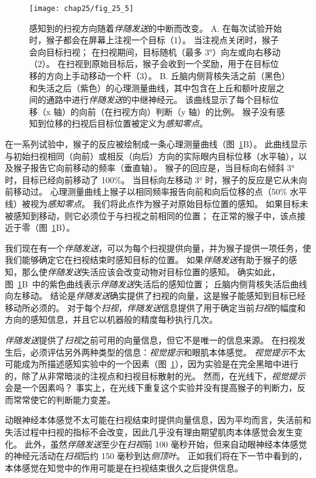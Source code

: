 \begin{figure}[htbp]
	\centering
	\texttt{[image: chap25/fig\_25\_5]}
	\caption{感知到的扫视方向随着\textit{伴随发送}的中断而改变。
		A. 在每次试验开始时，猴子都会在屏幕上注视一个目标（1）。
		当注视点关闭时，猴子会向目标扫视；
		在扫视期间，目标随机（最多 3°）向左或向右移动（2）。
		在扫视到原始目标后，猴子会收到一个奖励，用于在目标位移的方向上手动移动一个杆（3）。
		B. 丘脑内侧背核失活之前（黑色）和失活之后（紫色）的心理测量曲线，其中包含在上丘和额叶皮层之间的通路中进行\textit{伴随发送}的中继神经元。
		该曲线显示了每个目标位移（x 轴）的向前（在扫视方向）判断（y 轴）的比例。
		猴子没有感知到位移的扫视后目标位置被定义为\textit{感知零点}\cite{cavanaugh2016saccadic}。}
	\label{fig:25_5}
\end{figure}


在一系列试验中，猴子的反应被绘制成一条心理测量曲线（图~\ref{fig:25_5}B）。
此曲线显示与初始扫视相同（向前）或相反（向后）方向的实际眼内目标位移（水平轴），以及猴子报告它向前移动的频率（垂直轴）。
猴子的回应是，当目标向右倾斜 3° 时，目标已经向前移动了 100\%。
当目标向左移动 3° 时，猴子的反应是它从未向前移动过。
心理测量曲线上猴子以相同频率报告向前和向后位移的点（50\% 水平线）被视为\textit{感知零点}。
我们将此点作为猴子对原始目标位置的感知。
如果目标未被感知到移动，则它必须位于与扫视之前相同的位置；
在正常的猴子中，该点接近于零（图~\ref{fig:25_5}B）。


我们现在有一个\textit{伴随发送}，可以为每个扫视提供向量，并为猴子提供一项任务，使我们能够确定它在扫视结束时感知目标的位置。
如果\textit{伴随发送}有助于猴子的感知，那么使\textit{伴随发送}失活应该会改变动物对目标位置的感知。
确实如此，图~\ref{fig:25_5}B~中的紫色曲线表示\textit{伴随发送}失活后的感知位置；
丘脑内侧背核失活后曲线向左移动。
结论是\textit{伴随发送}确实提供了扫视的向量，这是猴子能感知到目标已经移动所必须的。
对于每个\textit{扫视}，\textit{伴随发送}信息提供了用于确定当前\textit{扫视}的幅度和方向的感知信息，并且它以机器般的精度每秒执行几次。


\textit{伴随发送}提供了\textit{扫视}之前可用的向量信息，但它不是唯一的信息来源。
在扫视发生后，必须评估另外两种类型的信息：\textit{视觉提示}和眼肌本体感觉。
\textit{视觉提示}不太可能成为所描述感知实验中的一个因素（图~\ref{fig:25_5}），因为实验是在完全黑暗中进行的，除了从非常暗淡的注视点和扫视目标散射的光。
然而，在光线下，\textit{视觉提示}会是一个因素吗？
事实上，在光线下重复这个实验并没有提高猴子的判断力，反而常常使它的判断能力变差。


动眼神经本体感觉不太可能在扫视结束时提供向量信息，因为平均而言，失活前和失活过程中扫视的指标不会改变，因此几乎没有理由期望肌肉本体感觉会发生变化。
此外，虽然\textit{伴随发送}至少在\textit{扫视}前 100 毫秒开始，但来自动眼神经本体感觉的神经元活动在\textit{扫视}后约 150 毫秒到达\textit{侧顶叶}。
正如我们将在下一节中看到的，本体感觉在知觉中的作用可能是在扫视结束很久之后提供信息。


